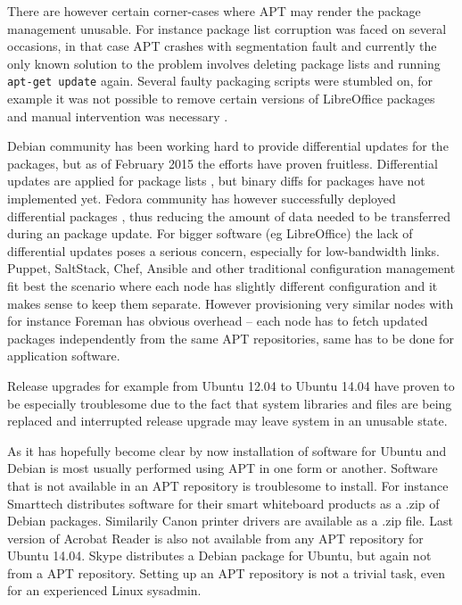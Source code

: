 \documentclass[a4paper,11pt]{kth-mag}
\begin{document}
There are however certain corner-cases where APT may render
the package management unusable.
For instance package list corruption was faced on several occasions,
in that case APT crashes with segmentation fault
\cite{apt-segfault}
and currently the only known solution to the problem
involves deleting package lists and running \lstinline!apt-get update! again.
Several faulty packaging scripts were stumbled on,
for example it was not possible to remove certain versions of LibreOffice packages
and manual intervention was necessary
\cite{upgrading-libreoffice}.

Debian community has been working hard to provide differential updates for
the packages, but as of February 2015 the efforts have proven fruitless.
Differential updates are applied for package lists
\cite{avoiding-slow-package-updates},
but binary diffs for packages have not implemented yet.
Fedora community has however successfully deployed differential packages
\cite{fedora-presto},
thus reducing the amount of data needed to be transferred during an package update.
For bigger software (eg LibreOffice) the lack of differential
updates poses a serious concern, especially for low-bandwidth links.
Puppet, SaltStack, Chef, Ansible and other traditional configuration
management fit best the scenario where each node has slightly different
configuration and it makes sense to keep them separate. However
provisioning very similar nodes with for instance Foreman has obvious
overhead -- each node has to fetch updated packages independently from
the same APT repositories, same has to be done for application software.

Release upgrades for example from Ubuntu 12.04 to Ubuntu 14.04
have proven to be especially troublesome due to the fact that system libraries
and files are being replaced and interrupted release upgrade may leave system
in an unusable state.

As it has hopefully become clear by now
installation of software for Ubuntu and Debian
is most usually performed using APT in one form or another.
Software that is not available in an APT repository
is troublesome to install.
For instance Smarttech distributes software for their smart
whiteboard products as a .zip of Debian packages.
Similarily Canon printer drivers are available as a .zip file.
Last version of Acrobat Reader is also not available
from any APT repository for Ubuntu 14.04.
Skype distributes a Debian package for Ubuntu, but again
not from a APT repository.
Setting up an APT repository is not a trivial task,
even for an experienced Linux sysadmin.
\end{document}
